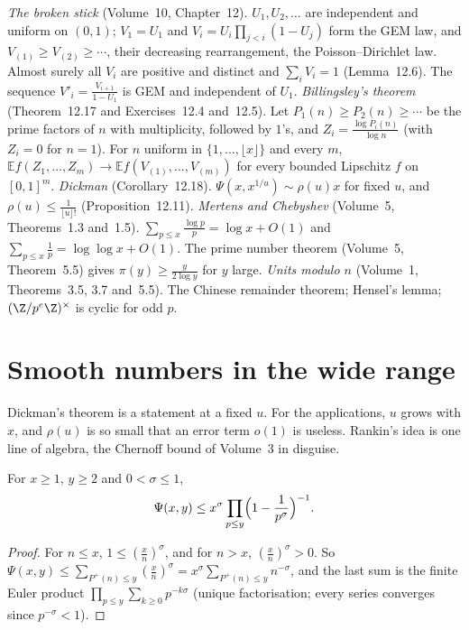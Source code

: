 \begin{reminder}
\emph{The broken stick} (Volume~10, Chapter~12). $U_1,U_2,\dots$ are independent and uniform on $(0,1)$; $V_1=U_1$ and $V_i=U_i\prod_{j<i}(1-U_j)$ form the GEM law, and $V_{(1)}\ge V_{(2)}\ge\cdots$, their decreasing rearrangement, the Poisson--Dirichlet law. Almost surely all $V_i$ are positive and distinct and $\sum_iV_i=1$ (Lemma~12.6). The sequence $V'_i=\frac{V_{i+1}}{1-U_1}$ is GEM and independent of $U_1$.
\emph{Billingsley's theorem} (Theorem~12.17 and Exercises~12.4 and~12.5). Let $P_1(n)\ge P_2(n)\ge\cdots$ be the prime factors of $n$ with multiplicity, followed by $1$'s, and $Z_i=\frac{\log P_i(n)}{\log n}$ (with $Z_i=0$ for $n=1$). For $n$ uniform in $\{1,\dots,\lfloor x\rfloor\}$ and every $m$, $\mathbb Ef(Z_1,\dots,Z_m)\to\mathbb Ef(V_{(1)},\dots,V_{(m)})$ for every bounded Lipschitz $f$ on $[0,1]^m$.
\emph{Dickman} (Corollary~12.18). $\Psi(x,x^{1/u})\sim\rho(u)x$ for fixed $u$, and $\rho(u)\le\frac1{\lfloor u\rfloor!}$ (Proposition~12.11).
\emph{Mertens and Chebyshev} (Volume~5, Theorems~1.3 and~1.5). $\sum_{p\le x}\frac{\log p}p=\log x+O(1)$ and $\sum_{p\le x}\frac1p=\log\log x+O(1)$. The prime number theorem (Volume~5, Theorem~5.5) gives $\pi(y)\ge\frac y{2\log y}$ for $y$ large.
\emph{Units modulo $n$} (Volume~1, Theorems~3.5, 3.7 and~5.5). The Chinese remainder theorem; Hensel's lemma; $(\Z/p^e\Z)^\times$ is cyclic for odd $p$.
\end{reminder}

\section{Smooth numbers in the wide range}\label{sec:rankin}

Dickman's theorem is a statement at a fixed $u$. For the applications, $u$ grows with $x$, and $\rho(u)$ is so small that an error term $o(1)$ is useless. Rankin's idea is one line of algebra, the Chernoff bound of Volume~3 in disguise.

\begin{proposition}\label{prop:rankin}
For $x\ge1$, $y\ge2$ and $0<\sigma\le1$,
\[
\Psi(x,y)\le x^\sigma\prod_{p\le y}\Bigl(1-\frac1{p^\sigma}\Bigr)^{-1}.
\]
\end{proposition}
\begin{proof}
For $n\le x$, $1\le(\frac xn)^\sigma$, and for $n>x$, $(\frac xn)^\sigma>0$. So
$\Psi(x,y)\le\sum_{P^+(n)\le y}(\frac xn)^\sigma=x^\sigma\sum_{P^+(n)\le y}n^{-\sigma}$, and the last sum is the finite Euler product $\prod_{p\le y}\sum_{k\ge0}p^{-k\sigma}$ (unique factorisation; every series converges since $p^{-\sigma}<1$).
\end{proof}

